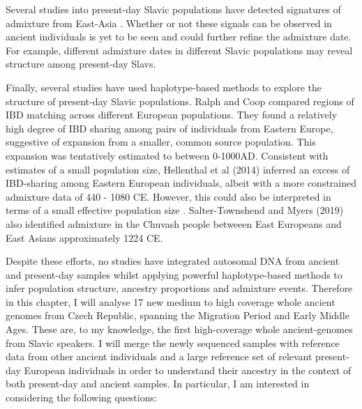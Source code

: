 Several studies into present-day Slavic populations have detected signatures of admixture from East-Asia \cite{Hellenthal2014, pankratov2016east, MOSAIC_2019, maliarchuk2008origin, qin2015quantitating}. Whether or not these signals can be observed in ancient individuals is yet to be seen and could further refine the admixture date. For example, different admixture dates in different Slavic populations may reveal structure among present-day Slavs. 

Finally, several studies have used haplotype-based methods to explore the structure of present-day Slavic populations. Ralph and Coop \cite{RalphCoop2013} compared regions of IBD matching  across different European populations. They found a relatively high degree of IBD sharing among pairs of individuals from Eastern Europe, suggestive of expansion from a smaller, common source population. This expansion was tentatively estimated to between 0-1000AD. Consistent with estimates of a small population size, Hellenthal et al (2014) \cite{Hellenthal2014} inferred an excess of IBD-sharing among Eastern European individuals, albeit with a more constrained admixture data of 440 - 1080 CE. However, this could also be interpreted in terms of a small effective population size \cite{al2019estimating, ringbauer2017inferring}. Salter-Townshend and Myers (2019) also identified admixture in the Chuvash people betweeen East Europeans and East Asians approximately 1224 CE.

Despite these efforts, no studies have integrated autosomal DNA from ancient and present-day samples whilst applying powerful haplotype-based methods to infer population structure, ancestry proportions and admixture events. Therefore in this chapter, I will analyse 17 new medium to high coverage whole ancient genomes from Czech Republic, spanning the Migration Period and Early Middle Ages. These are, to my knowledge, the first high-coverage whole ancient-genomes from Slavic speakers. I will merge the newly sequenced samples with reference data from other ancient individuals and a large reference set of relevant present-day European individuals in order to understand their ancestry in the context of both present-day and ancient samples. In particular, I am interested in considering the following questions:

